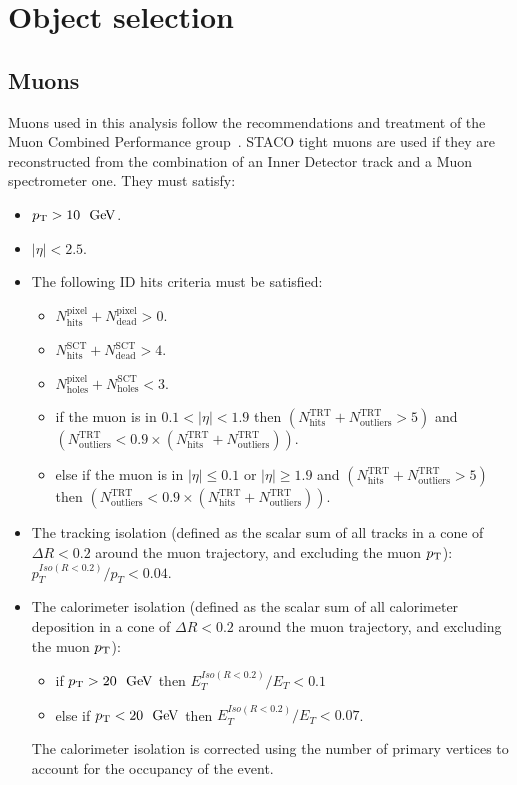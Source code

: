 \section{Object selection}
\label{sec:Object_selection}
\subsection{Muons}

Muons used in this analysis follow the recommendations and treatment
of the Muon Combined Performance group~\cite{MCP:Guidelines}. STACO
tight muons are used if they are reconstructed from the combination of
an Inner Detector track and a Muon spectrometer one.  They must
satisfy:

\begin{itemize}
\item $\pt>10~\GeV$.
\item $|\eta|<2.5$.
\item The following ID hits criteria must be satisfied:
   \begin{itemize}
   \item $N^{\mathrm{pixel}}_{\mathrm{hits}}+N^{\mathrm{pixel}}_{\mathrm{dead}}>0$.
   \item $N^{\mathrm{SCT}}_{\mathrm{hits}}+N^{\mathrm{SCT}}_{\mathrm{dead}}>4$.
   \item $N^{\mathrm{pixel}}_{\mathrm{holes}}+N^{\mathrm{SCT}}_{\mathrm{holes}}<3$.
   \item if the muon is in $0.1<|\eta|<1.9$ then $(N^{\mathrm{TRT}}_{\mathrm{hits}}+N^{\mathrm{TRT}}_{\mathrm{outliers}}>5)$ and $(N^{\mathrm{TRT}}_{\mathrm{outliers}}<0.9\times{}(N^{\mathrm{TRT}}_{\mathrm{hits}}+N^{\mathrm{TRT}}_{\mathrm{outliers}}))$.
   \item else if the muon is in $|\eta|\leq{}0.1$ or $|\eta|\geq{}1.9$ and $(N^{\mathrm{TRT}}_{\mathrm{hits}}+N^{\mathrm{TRT}}_{\mathrm{outliers}}>5)$ then $(N^{\mathrm{TRT}}_{\mathrm{outliers}}<0.9\times{}(N^{\mathrm{TRT}}_{\mathrm{hits}}+N^{\mathrm{TRT}}_{\mathrm{outliers}}))$.
   \end{itemize}
\item The tracking isolation (defined as the scalar sum of all tracks in a cone of $\Delta{}R<0.2$ around the muon trajectory, and excluding the muon $p_{\mathrm{T}}$): $p_{T}^{Iso(R<0.2)}/p_{T}<0.04$.
\item The calorimeter isolation (defined as the scalar sum of all calorimeter deposition in a cone of $\Delta{}R<0.2$ around the muon trajectory, and excluding the muon $p_{\mathrm{T}}$): 
   \begin{itemize}
   \item if $\pt>20~\GeV$ then $E_{T}^{Iso(R<0.2)}/E_{T}<0.1$
   \item else if $\pt<20~\GeV$ then $E_{T}^{Iso(R<0.2)}/E_{T}<0.07$.
   \end{itemize}
    The calorimeter isolation is corrected using the number of primary vertices to account for the occupancy of the event.


\end{itemize}
